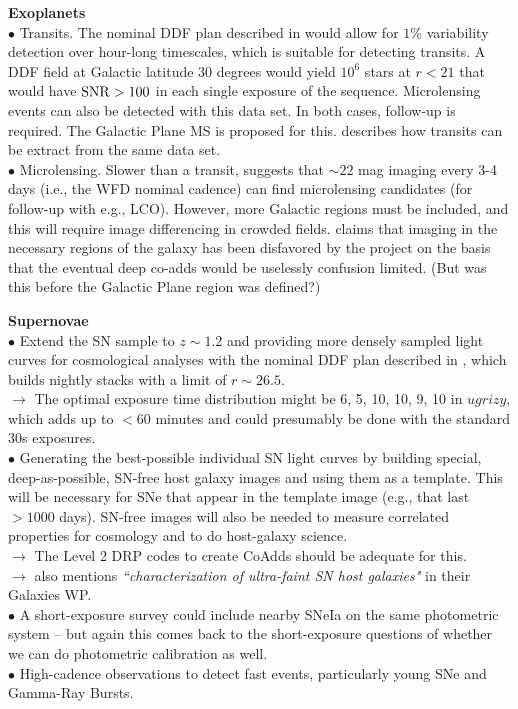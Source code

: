 \documentclass[DM,lsstdraft,toc]{lsstdoc}
\begin{document}
\noindent \textbf{Exoplanets} \\ 
$\bullet$ Transits. The nominal DDF plan described in \cite{2008arXiv0805.2366I} would allow for $1\%$ variability detection over hour-long timescales, which is suitable for detecting transits. A DDF field at Galactic latitude $30$ degrees would yield $10^6$ stars at $r<21$ that would have ${\rm SNR}>100$ in each single exposure of the sequence. Microlensing events can also be detected with this data set. In both cases, follow-up is required. The Galactic Plane MS is proposed for this. \cite{2013arXiv1304.3455G} describes how transits can be extract from the same data set.\\
$\bullet$ Microlensing. Slower than a transit, \cite{2013arXiv1304.3455G} suggests that $\sim22$ mag imaging every 3-4 days (i.e., the WFD nominal cadence) can find microlensing candidates (for follow-up with e.g., LCO). However, more Galactic regions must be included, and this will require image differencing in crowded fields. \cite{2013arXiv1304.3455G} claims that imaging in the necessary regions of the galaxy has been disfavored by the project on the basis that the eventual deep co-adds would be uselessly confusion limited. (But was this before the Galactic Plane region was defined?)

\noindent \textbf{Supernovae} \\
$\bullet$ Extend the SN sample to $z\sim1.2$ and providing more densely sampled light curves for cosmological analyses with the nominal DDF plan described in \cite{2008arXiv0805.2366I}, which builds nightly stacks with a limit of $r\sim26.5$. \\
$\rightarrow$ The optimal exposure time distribution might be 6, 5, 10, 10, 9, 10 in $ugrizy$, which adds up to $<60$ minutes and could presumably be done with the standard 30s exposures. \cite{KesslerWP} \\
$\bullet$ Generating the best-possible individual SN light curves by building special, deep-as-possible, SN-free host galaxy images and using them as a template. This will be necessary for SNe that appear in the template image (e.g., that last $>1000$ days). SN-free images will also be needed to measure correlated properties for cosmology and to do host-galaxy science. \\
$\rightarrow$ The Level 2 DRP codes to create CoAdds should be adequate for this. \\
$\rightarrow$ \cite{FergusonWP} also mentions {\it ``characterization of ultra-faint SN host galaxies"} in their Galaxies WP. \\
$\bullet$ A short-exposure survey could include nearby SNeIa on the same photometric system -- but again this comes back to the short-exposure questions of whether we can do photometric calibration as well.\\
$\bullet$ High-cadence observations to detect fast events, particularly young SNe and Gamma-Ray Bursts. \\
\end{document}
